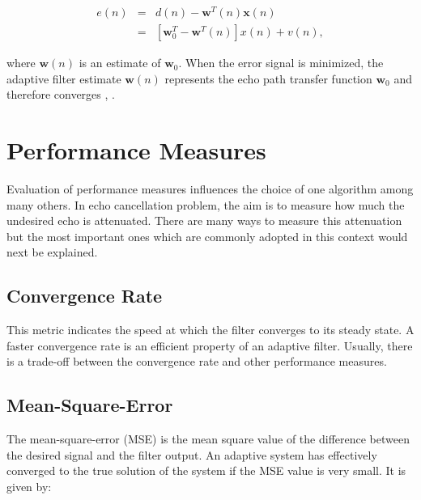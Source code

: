  \vspace{-1.5cm}
 \begin{eqnarray}
 \nonumber
 e(n)&=&d(n)-\textbf{w}^T(n)\textbf{x}(n)\\
 &=&[\textbf{w}_0^{T}-\textbf{w}^{T}(n)] x(n)+v(n),\label{eq2a}
 \end{eqnarray}

 \vspace{-0.6cm}
 \noindent where $\textbf{w}(n)$ is an estimate of $\textbf{w}_{0}$. When the error signal is minimized, the adaptive filter estimate $\textbf{w}(n)$
 represents the echo path transfer function $\textbf{w}_{0}$ and therefore converges \cite{Elko}, \cite{Peterson}.


\vspace{-0.3cm}
\section{Performance Measures}\label{sec:1.6}
\vspace{-0.5cm}
\noindent Evaluation of performance measures influences the choice of one algorithm among many others. In echo cancellation problem, the aim is to measure how much the undesired echo is attenuated. There are many ways to measure this attenuation but the most important ones which are commonly adopted in this context would next be explained.

\vspace{-0.3cm}
\subsection{Convergence Rate} \label{sec:1.6.1}
\vspace{-0.5cm}
\noindent This metric indicates the speed at which the filter converges to its steady state. A faster convergence rate is an efficient property of an adaptive filter. Usually, there is a trade-off between the convergence rate and other performance measures.

\vspace{-0.3cm}
\subsection{Mean-Square-Error} \label{sec:1.6.2}
\vspace{-0.5cm}
\noindent The mean-square-error (MSE) is the mean square value of the difference between the desired signal and the filter output. An adaptive system has effectively converged to the true solution of the system if the MSE value is very small. It is given by:


